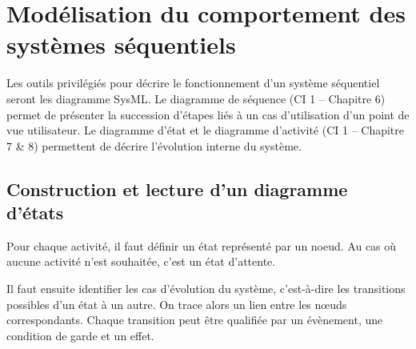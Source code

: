 \documentclass[10pt]{article}
\begin{document}
\section{Modélisation du comportement des systèmes séquentiels \cite{pb}}

Les outils privilégiés pour décrire le fonctionnement d'un système séquentiel seront les diagramme SysML. Le diagramme de séquence (CI 1 -- Chapitre 6) permet de présenter la succession d'étapes liés à un cas d'utilisation d'un point de vue utilisateur. Le diagramme d'état et le diagramme d'activité (CI 1 -- Chapitre 7 \& 8) permettent de décrire l'évolution interne du système. 
                           

\subsection{Construction et lecture d'un diagramme d'états}

\begin{methode}
  Pour chaque activité, il faut définir un état représenté par un noeud. Au cas où
aucune activité n’est souhaitée, c’est un état d’attente.

Il faut ensuite identifier les cas d’évolution du système, c'est-à-dire les transitions
possibles d’un état à un autre. On trace alors un lien entre les n\oe{}uds
correspondants. Chaque transition peut être qualifiée par un évènement, une
condition de garde et un effet.
\end{methode}
\end{document}
